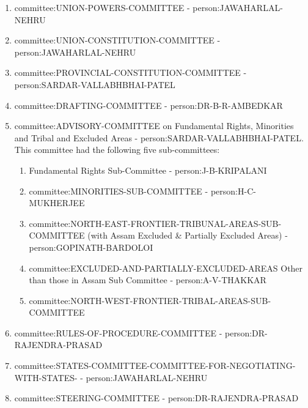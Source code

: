 \begin{enumerate}
  \item \gls{committee:UNION-POWERS-COMMITTEE} - \gls{person:JAWAHARLAL-NEHRU}
  \item \gls{committee:UNION-CONSTITUTION-COMMITTEE} - \gls{person:JAWAHARLAL-NEHRU}
  \item \gls{committee:PROVINCIAL-CONSTITUTION-COMMITTEE} - \gls{person:SARDAR-VALLABHBHAI-PATEL}
  \item \gls{committee:DRAFTING-COMMITTEE} - \gls{person:DR-B-R-AMBEDKAR}
  \item \gls{committee:ADVISORY-COMMITTEE} on Fundamental Rights, Minorities and Tribal and Excluded Areas - \gls{person:SARDAR-VALLABHBHAI-PATEL}. This committee had the following five sub-committees:
  \begin{enumerate}
    \item Fundamental Rights Sub-Committee - \gls{person:J-B-KRIPALANI}
    \item \gls{committee:MINORITIES-SUB-COMMITTEE} - \gls{person:H-C-MUKHERJEE}
    \item \gls{committee:NORTH-EAST-FRONTIER-TRIBUNAL-AREAS-SUB-COMMITTEE} (with Assam Excluded \& Partially Excluded Areas) - \gls{person:GOPINATH-BARDOLOI}
    \item \gls{committee:EXCLUDED-AND-PARTIALLY-EXCLUDED-AREAS} Other than those in Assam Sub Committee - \gls{person:A-V-THAKKAR}
    \item \gls{committee:NORTH-WEST-FRONTIER-TRIBAL-AREAS-SUB-COMMITTEE}
  \end{enumerate}

  \item \gls{committee:RULES-OF-PROCEDURE-COMMITTEE} - \gls{person:DR-RAJENDRA-PRASAD}
  \item \gls{committee:STATES-COMMITTEE-COMMITTEE-FOR-NEGOTIATING-WITH-STATES-} - \gls{person:JAWAHARLAL-NEHRU}
  \item \gls{committee:STEERING-COMMITTEE} - \gls{person:DR-RAJENDRA-PRASAD}
\end{enumerate}

